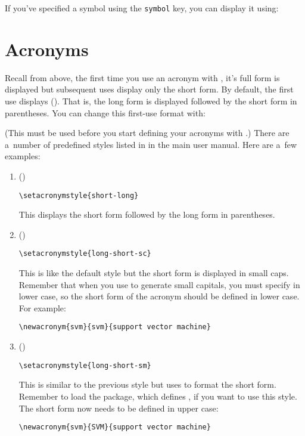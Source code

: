 \documentclass{nlctdoc}
\begin{document}
If you've specified a symbol using the \texttt{symbol} key, you can
display it using:
\begin{definition}
\end{definition}

\section{Acronyms}
\label{sec:acronyms}

Recall from above, the first time you use an acronym
with , it's full form is displayed but subsequent uses
display only the short form. By default, the first use displays
 (). That is, the long form is displayed
followed by the short form in parentheses. You can change this
first-use format with:
\begin{definition}
\end{definition}
(This must be used before you start defining your acronyms with
.) There are a~number of predefined styles listed in
 in the main  user manual. Here are
a~few examples:
\begin{enumerate}
\item {} ()
\begin{verbatim}
\setacronymstyle{short-long}
\end{verbatim}
This displays the short form followed by the long form in
parentheses.

\item {} ()
\begin{verbatim}
\setacronymstyle{long-short-sc}
\end{verbatim}
This is like the default style but the short form is displayed in
small caps. Remember that when you use  to generate small
capitals, you must specify  in lower case, so the short
form of the acronym should be defined in lower case. For example:
\begin{verbatim}
\newacronym{svm}{svm}{support vector machine}
\end{verbatim}

\item {} ()
\begin{verbatim}
\setacronymstyle{long-short-sm}
\end{verbatim}
This is similar to the previous style but uses  to
format the short form. Remember to load the  package,
which defines , if you want to use this style. The
short form now needs to be defined in upper case:
\begin{verbatim}
\newacronym{svm}{SVM}{support vector machine}
\end{verbatim}

\end{enumerate}
\end{document}
